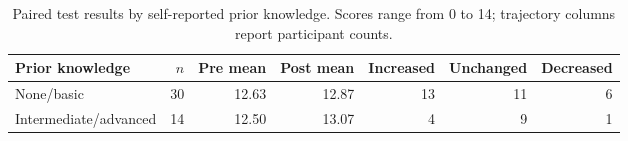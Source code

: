 \begin{table}[htbp]
\centering
\small
\caption{Paired test results by self-reported prior knowledge. Scores range from 0 to 14; trajectory columns report participant counts.}
\label{tab:knowledge-groups}
\begin{tabular}{lrrrrrr}
\toprule
Prior knowledge & $n$ & Pre mean & Post mean & Increased & Unchanged & Decreased \\
\midrule
None/basic & 30 & 12.63 & 12.87 & 13 & 11 & 6 \\
Intermediate/advanced & 14 & 12.50 & 13.07 & 4 & 9 & 1 \\
\bottomrule
\end{tabular}
\end{table}
